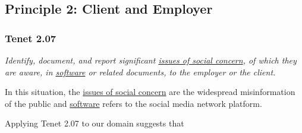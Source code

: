 

\subsection{Principle 2: Client and Employer}

\subsubsection{Tenet 2.07}
\emph{Identify, document, and report significant \ul{issues of social concern}, of which they are aware, in \ul{software} or related documents, to the employer or the client. \cite{se_code}}

\tenetmargin

In this situation, the \ul{issues of social concern} are the widespread misinformation of the public and \ul{software} refers to the social media network platform.


Applying Tenet 2.07 to our domain suggests that
